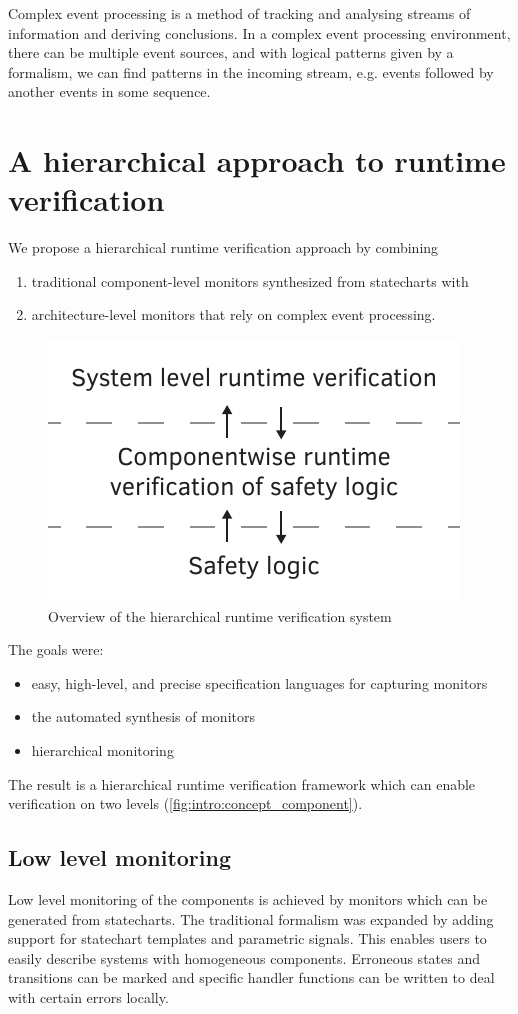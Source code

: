 Complex event processing is a method of tracking and analysing streams of information and deriving conclusions. In a complex event processing environment, there can be multiple event sources, and with logical patterns given by a formalism, we can find patterns in the incoming stream, e.g. events followed by another events in some sequence.

\section{A hierarchical approach to runtime verification}

We propose a hierarchical runtime verification approach by combining
\begin{enumerate}
\item traditional component-level monitors synthesized from statecharts with 
\item architecture-level monitors that rely on complex event processing.
\end{enumerate}

\begin{figure}[h]
	\centering
	\includegraphics[width=0.4\linewidth]{include/figures/chapter_6/overview_1}
	\caption{Overview of the hierarchical runtime verification system}
	\label{fig:case_study:fov}
\end{figure}

The goals were:
\begin{itemize}
\item easy, high-level, and precise specification languages for capturing monitors
\item the automated synthesis of monitors
\item hierarchical monitoring
\end {itemize}

The result is a hierarchical runtime verification framework which can enable verification on two levels (\cref{fig:intro:concept_component}).

\subsection{Low level monitoring}
Low level monitoring of the components is achieved by monitors which can be generated from statecharts. The traditional formalism was expanded by adding support for statechart templates and parametric signals. This enables users to easily describe systems with homogeneous components. Erroneous states and transitions can be marked and specific handler functions can be written to deal with certain errors locally.

